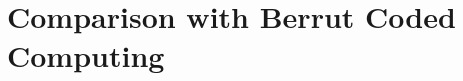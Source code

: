 \documentclass{article}
\def\nprcc{\texttt{LeTCC}}
\begin{document}

\section{Comparison with Berrut Coded Computing}\label{app:comp_berrut}
\end{document}
